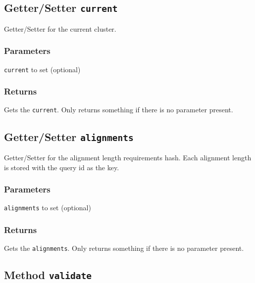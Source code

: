 \subsection*{Getter/Setter \texttt{current}\label{Getter_Setter_current}}


Getter/Setter for the current cluster.

\subsubsection*{Parameters\label{Parameters}}
\begin{description}

\item[{\texttt{current} to set (optional)}] \mbox{}\end{description}
\subsubsection*{Returns\label{Returns}}


Gets the \texttt{current}. Only returns something if there is no parameter present.

\subsection*{Getter/Setter \texttt{alignments}\label{Getter_Setter_alignments}}


Getter/Setter for the alignment length requirements hash. Each alignment length 
is stored with the query id as the key.

\subsubsection*{Parameters\label{Parameters}}
\begin{description}

\item[{\texttt{alignments} to set (optional)}] \mbox{}\end{description}
\subsubsection*{Returns\label{Returns}}


Gets the \texttt{alignments}. Only returns something if there is no parameter present.

\subsection*{Method \texttt{validate}\label{Method_validate}}


